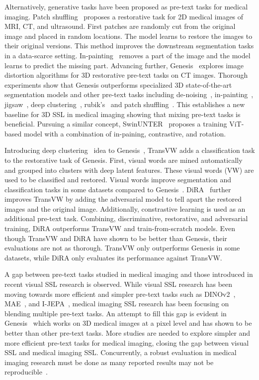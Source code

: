 \documentclass[a4paper,11pt,oneside]{report}
\begin{document}
Alternatively, generative tasks have been proposed as pre-text tasks for medical imaging. Patch shuffling~\cite{Chen2019} proposes a restorative task for 2D medical images of MRI, CT, and ultrasound. First patches are randomly cut from the original image and placed in random locations. The model learns to restore the images to their original versions. This method improves the downstream segmentation tasks in a data-scarce setting. In-painting~\cite{Pathak2016} removes a part of the image and the model learns to predict the missing part. Advancing further, Genesis~\cite{Zhou2021} explores image distortion algorithms for 3D restorative pre-text tasks on CT images. Thorough experiments show that Genesis outperforms specialized 3D state-of-the-art segmentation models and other pre-text tasks including de-noising~\cite{Vincent2010}, in-painting~\cite{Pathak2016}, jigsaw~\cite{Noroozi2016}, deep clustering~\cite{Caron2018}, rubik's~\cite{Zhuang2019} and patch shuffling~\cite{Chen2019}. This establishes a new baseline for 3D SSL in medical imaging showing that mixing pre-text tasks is beneficial. Pursuing a similar concept, SwinUNTER~\cite{Tang2022} proposes a training ViT-based model with a combination of in-paining, contrastive, and rotation.

Introducing deep clustering~\cite{Caron2018} idea to Genesis~\cite{Zhou2021}, TransVW adds a classification task to the restorative task of Genesis. First, visual words are mined automatically and grouped into clusters with deep latent features. These visual words (VW) are used to be classified and restored. Visual words improve segmentation and classification tasks in some datasets compared to Genesis~\cite{Haghighi2021}. DiRA~\cite{Haghighi2024} further improves TransVW by adding the adversarial model to tell apart the restored images and the original image. Additionally, constrastive learning is used as an additional pre-text task. Combining, discriminative, restorative, and adversarial training, DiRA outperforms TransVW and train-from-scratch models. Even though TransVW and DiRA have shown to be better than Genesis, their evaluations are not as thorough. TransVW only outperforms Genesis in some datasets, while DiRA only evaluates its performance against TransVW.

A gap between pre-text tasks studied in medical imaging and those introduced in recent visual SSL research is observed. While visual SSL research has been moving towards more efficient and simpler pre-text tasks such as DINOv2~\cite{Oquab2024dinov}, MAE~\cite{He2022}, and I-JEPA~\cite{Assran2023}, medical imaging SSL research has been focusing on blending multiple pre-text tasks. An attempt to fill this gap is evident in Genesis~\cite{Zhou2021} which works on 3D medical images at a pixel level and has shown to be better than other pre-text tasks. More studies are needed to explore simpler and more efficient pre-text tasks for medical imaging, closing the gap between visual SSL and medical imaging SSL. Concurrently, a robust evaluation in medical imaging research must be done as many reported results may not be reproducible~\cite{Isensee2024}.
\end{document}
